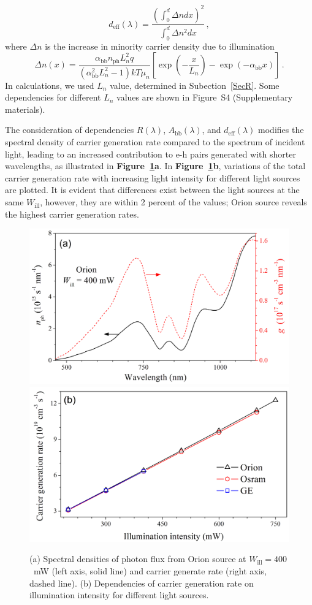 \documentclass{WileyMSP-template}
\begin{document}
\begin{equation}
\label{eqdeff}
d_\mathrm{eff}(\lambda)=\frac{\left(\int_0^d \Delta n dx\right)^2}{\int_0^d \Delta n^2 dx}\,,
\end{equation}
where
$\Delta n$ is the increase in minority carrier density due to illumination
\begin{equation}
\label{eqdeln}
\Delta n (x)=\frac{\alpha_\mathrm{bb} n_\mathrm{ph} L_n^2 q}{(\alpha_\mathrm{bb}^2 L_n^2-1)kT\mu_n}
\left[\exp\left(-\frac{x}{L_n}\right)-\exp\left(-\alpha_\mathrm{bb} x\right)\right]\,.
\end{equation}
In calculations, we used $L_n$ value, determined in Subection~\ref{SecR}.
Some dependencies for different $L_n$ values are shown in Figure~S4 (Supplementary materials).

The consideration of dependencies $R(\lambda)$, $A_\mathrm{bb}(\lambda)$, and $d_\mathrm{eff}(\lambda)$ modifies
the spectral density of carrier generation rate compared to the spectrum of incident light,
leading to an increased contribution to e-h pairs generated with shorter wavelengths,
as illustrated in \textbf{Figure~\ref{fig5}a}.
In \textbf{Figure~\ref{fig5}b}, variations of the total carrier generation rate with increasing light intensity for different light sources are plotted.
It is evident that differences exist between the light sources at the same $W_\mathrm{ill}$,
however, they are within 2 percent of the values;
Orion source reveals the highest carrier generation rates.


\begin{figure}
\centering
  \includegraphics[width=0.4\linewidth]{Fig5a.png}
  \includegraphics[width=0.4\linewidth]{Fig5b.png}
  \caption{
  (a) Spectral densities of photon flux from Orion source at $W_\mathrm{ill}=400$~mW (left axis, solid line) and carrier generate rate (right axis, dashed line).
    (b) Dependencies of carrier generation rate on illumination intensity for different light sources.
  }
  \label{fig5}
\end{figure}
\end{document}
